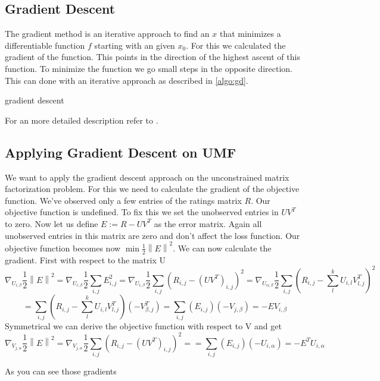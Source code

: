\documentclass[]{scrartcl}
\newcommand{\norm}[1]{\left\lVert#1\right\rVert}
\begin{document}
\subsection{Gradient Descent}
The gradient method is an iterative approach to find an $x$ that minimizes a differentiable function $f$ starting with an given $x_0$. For this we calculated the gradient of the function. This points in the direction of the highest ascent of this function. To minimize the function we go small steps in the opposite direction. This can done with an iterative approach as described in \ref{algo:gd}. 

\begin{algorithm}[H]
	\caption{gradient descent}
	\label{algo:gd}

\end{algorithm}
For an more detailed description refer to \cite{ShSh14}.


\subsection{Applying Gradient Descent on UMF} 
We want to apply the gradient descent approach on the unconstrained matrix factorization problem. For this we need to calculate the gradient of the objective function. We've observed only a few entries of the ratings matrix $R$. Our objective function is undefined. To fix this we set the unobserved entries in $UV^T$ to zero. 
Now let us define $E:=R-UV^T$ as the error matrix. Again all unobserved entries in this matrix are zero and don't affect the loss function. Our objective function becomes now $\min\frac{1}{2}\norm{E}^2$.
We can now calculate the gradient.
First with respect to the matrix U
\[\nabla_{U_{i,\beta}} \frac{1}{2}\norm{E}^2 = \nabla_{U_{i,\beta}} \frac{1}{2}\sum_{i,j}E_{i,j}^2=\nabla_{U_{i,\beta}} \frac{1}{2}\sum_{i,j}(R_{i,j}-(UV^T)_{i,j})^2=
\nabla_{U_{\alpha,\beta}} \frac{1}{2}\sum_{i,j}(R_{i,j}-\sum_{l}^k U_{i,l}V^T_{l,j})^2\]
\[=\sum_{i,j}(R_{i,j}-\sum_{l}^k U_{i,l}V^T_{l,j})(-V^T_{\beta,j})=\sum_{i,j}(E_{i,j})(-V_{j,\beta})=-EV_{i,\beta} \]
Symmetrical we can derive the objective function with respect to V and get 
\[\nabla_{V_{j,\alpha}} \frac{1}{2}\norm{E}^2 = \nabla_{V_{j,\alpha}} \frac{1}{2}\sum_{i,j}(R_{i,j}-(UV^T)_{i,j})^2=
=\sum_{i,j}(E_{i,j})(-U_{i,\alpha})=-E^TU_{i,\alpha} \]

As you can see those gradients 
\end{document}
